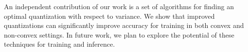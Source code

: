 \documentclass{article}
\begin{document}
An independent contribution of our work is a set of algorithms for finding an optimal quantization with respect to variance. 
We show that improved quantizations can significantly improve accuracy for training in both convex and non-convex settings. 
In future work, we plan to explore the potential of these techniques for training and inference.  

\cleardoublepage







\end{document}
